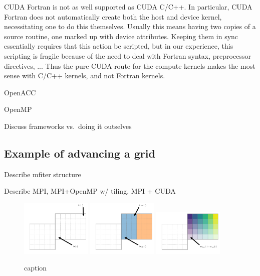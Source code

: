 \documentclass[twocolumn,times]{aastex62}
\begin{document}
CUDA Fortran is not as well supported as CUDA C/C++.  In particular,
CUDA Fortran does not automatically create both the host and device
kernel, necessitating one to do this themselves.  Usually this means
having two copies of a source routine, one marked up with device
attributes.  Keeping them in sync essentially requires that this
action be scripted, but in our experience, this scripting is fragile
because of the need to deal with Fortran syntax, preprocessor
directives, ...  Thus the pure CUDA route for the compute kernels makes the most sense
with C/C++ kernels, and not Fortran kernels.

OpenACC


OpenMP

Discuss frameworks vs.\ doing it outselves




\subsection{Example of advancing a grid}

Describe mfiter structure

Describe MPI, MPI+OpenMP w/ tiling, MPI + CUDA

\begin{figure}
\centering
\includegraphics[width=0.3\textwidth]{gpu_1} 
\includegraphics[width=0.3\textwidth]{gpu_2} 
\includegraphics[width=0.3\textwidth]{gpu_3}
\caption{\label{fig:loops} caption}
\end{figure}
\end{document}
